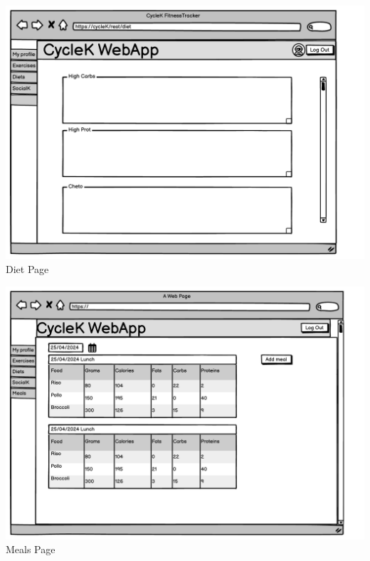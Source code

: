 \begin{center}
\includegraphics[scale=0.47]{Resources/Mockup/DietMockup.pdf}\\
Diet Page
\end{center}
\begin{center}
\includegraphics[scale=0.47]{Resources/Mockup/Meals.pdf}\\
Meals Page
\end{center}

